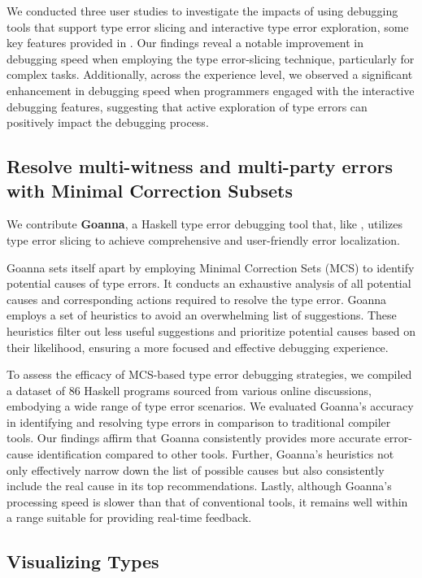 We conducted three user studies to investigate the impacts of using debugging tools that support type error slicing and interactive type error exploration, some key features provided in \chameleon{}. Our findings reveal a notable improvement in debugging speed when employing the type error-slicing technique, particularly for complex tasks. Additionally, across the experience level, we observed a significant enhancement in debugging speed when programmers engaged with the interactive debugging features, suggesting that active exploration of type errors can positively impact the debugging process.

\subsection{Resolve multi-witness and multi-party errors with Minimal Correction Subsets}

We contribute \textbf{Goanna}, a Haskell type error debugging tool that, like \chameleon{}, utilizes type error slicing to achieve comprehensive and user-friendly error localization.

Goanna sets itself apart by employing Minimal Correction Sets (MCS) to identify potential causes of type errors. It conducts an exhaustive analysis of all potential causes and corresponding actions required to resolve the type error. Goanna employs a set of heuristics to avoid an overwhelming list of suggestions. These heuristics filter out less useful suggestions and prioritize potential causes based on their likelihood, ensuring a more focused and effective debugging experience.


To assess the efficacy of MCS-based type error debugging strategies, we compiled a dataset of 86 Haskell programs sourced from various online discussions, embodying a wide range of type error scenarios. We evaluated Goanna's accuracy in identifying and resolving type errors in comparison to traditional compiler tools. Our findings affirm that Goanna consistently provides more accurate error-cause identification compared to other tools. Further, Goanna's heuristics not only effectively narrow down the list of possible causes but also consistently include the real cause in its top recommendations. Lastly, although Goanna's processing speed is slower than that of conventional tools, it remains well within a range suitable for providing real-time feedback. 

\subsection{Visualizing Types}

